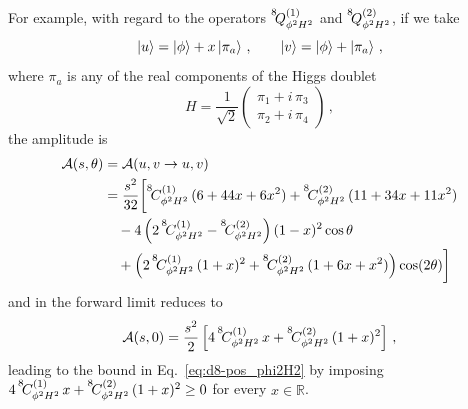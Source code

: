 For example, with regard to the operators $\op{8}{\phi^2 H^2}{(1)}$ and $\op{8}{\phi^2 H^2}{(2)}$, if we take 
\begin{equation}
    \ket{u} = \ket{\phi} + x \ket{\pi_a} \,, \qquad \ket{v} = \ket{\phi} + \ket{\pi_a}\,,
\end{equation}
where $\pi_a$ is any of the real components of the Higgs doublet
\begin{equation}
    H =\frac{1}{\sqrt{2}} \begin{pmatrix}
        \pi_1 + i\, \pi_3 \\ \pi_2 + i\, \pi_4 
    \end{pmatrix}\,,
\end{equation}
the amplitude is
\begin{align}
    \mathcal A (s,\theta) &= \mathcal A (u,v \to u,v) \nonumber\\&
    = \frac{s^2}{32}\bigg[
    \coef{8}{\phi^2 H^2}{(1)}\,(6 + 44x + 6x^{2})
  + \coef{8}{\phi^2 H^2}{(2)}\,(11+34x+11x^2)
  \nonumber  \\&\quad - 4 \left(2\,\coef{8}{\phi^2 H^2}{(1)} - \coef{8}{\phi^2 H^2}{(2)}\right)(1 - x)^{2}\cos\theta \nonumber  \\&\quad
  + \left(2\,\coef{8}{\phi^2 H^2}{(1)}\,(1 + x)^{2} + \coef{8}{\phi^2 H^2}{(2)}\,(1+6x+x^2)\right)\cos(2\theta)
\bigg]
\end{align}
and in the forward limit reduces to
\begin{equation}
    \mathcal A (s,0) = \frac{s^2}{2}\left[4\, \coef{8}{\phi^2 H^2}{(1)}\,x +  \coef{8}{\phi^2 H^2}{(2)}\, (1+x)^2\right]\,,
\end{equation}
leading to the bound in Eq.~\eqref{eq:d8-pos_phi2H2} by imposing $4\, \coef{8}{\phi^2 H^2}{(1)}\,x +  \coef{8}{\phi^2 H^2}{(2)} \,(1+x)^2 \ge 0$ for every $x \in \mathbb{R}$.

